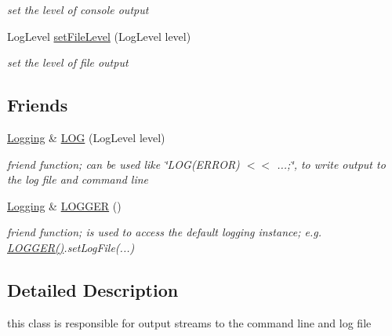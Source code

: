 \begin{DoxyCompactItemize}
\begin{DoxyCompactList}\small\item\em set the level of console output \end{DoxyCompactList}\item 
\hypertarget{classnatrium_1_1Logging_a21852bc69b5ff32f5ec5241a810ab8d5}{Log\-Level \hyperlink{classnatrium_1_1Logging_a21852bc69b5ff32f5ec5241a810ab8d5}{set\-File\-Level} (Log\-Level level)}\label{classnatrium_1_1Logging_a21852bc69b5ff32f5ec5241a810ab8d5}

\begin{DoxyCompactList}\small\item\em set the level of file output \end{DoxyCompactList}\end{DoxyCompactItemize}
\subsection*{Friends}
\begin{DoxyCompactItemize}
\item 
\hyperlink{classnatrium_1_1Logging}{Logging} \& \hyperlink{classnatrium_1_1Logging_a913b816565b3ede4c25b89d25ca5148d}{L\-O\-G} (Log\-Level level)
\begin{DoxyCompactList}\small\item\em friend function; can be used like \char`\"{}\-L\-O\-G(\-E\-R\-R\-O\-R) $<$$<$ ...;\char`\"{}, to write output to the log file and command line \end{DoxyCompactList}\item 
\hypertarget{classnatrium_1_1Logging_a9339ce5458ee8cadf69734faf310c21b}{\hyperlink{classnatrium_1_1Logging}{Logging} \& \hyperlink{classnatrium_1_1Logging_a9339ce5458ee8cadf69734faf310c21b}{L\-O\-G\-G\-E\-R} ()}\label{classnatrium_1_1Logging_a9339ce5458ee8cadf69734faf310c21b}

\begin{DoxyCompactList}\small\item\em friend function; is used to access the default logging instance; e.\-g. \hyperlink{classnatrium_1_1Logging_a9339ce5458ee8cadf69734faf310c21b}{L\-O\-G\-G\-E\-R()}.set\-Log\-File(...) \end{DoxyCompactList}\end{DoxyCompactItemize}


\subsection{Detailed Description}
this class is responsible for output streams to the command line and log file 

